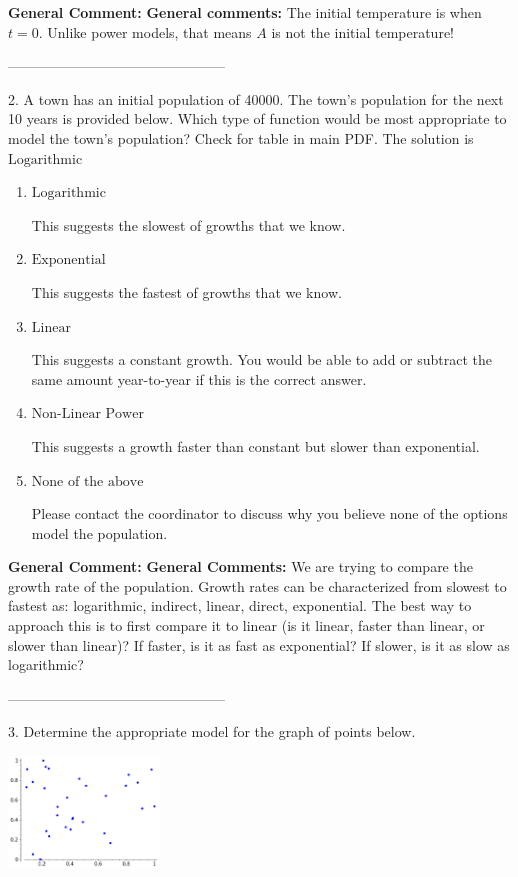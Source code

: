 \documentclass{extbook}[14pt]
\begin{document}
\textbf{General Comment:} \textbf{General comments:} The initial temperature is when $t = 0$. Unlike power models, that means $A$ is not the initial temperature! 

-----------------------------------------------

2. A town has an initial population of 40000. The town's population for the next 10 years is provided below. Which type of function would be most appropriate to model the town's population?
Check for table in main PDF. 
The solution is $ \text{Logarithmic} $ 

\begin{enumerate}[label=\Alph*.] 
\item $ \text{Logarithmic} $ 

 This suggests the slowest of growths that we know. 
\item $ \text{Exponential} $ 

 This suggests the fastest of growths that we know. 
\item $ \text{Linear} $ 

 This suggests a constant growth. You would be able to add or subtract the same amount year-to-year if this is the correct answer. 
\item $ \text{Non-Linear Power} $ 

 This suggests a growth faster than constant but slower than exponential. 
\item $ \text{None of the above} $ 

 Please contact the coordinator to discuss why you believe none of the options model the population. 
\end{enumerate} 
 
\textbf{General Comment:} \textbf{General Comments:} We are trying to compare the growth rate of the population. Growth rates can be characterized from slowest to fastest as: logarithmic, indirect, linear, direct, exponential. The best way to approach this is to first compare it to linear (is it linear, faster than linear, or slower than linear)? If faster, is it as fast as exponential? If slower, is it as slow as logarithmic? 

-----------------------------------------------

3. Determine the appropriate model for the graph of points below.
\begin{center} \includegraphics[width=0.3\textwidth]{../Figures/identifyModelGraph11C.png} \end{center} 
\end{document}
